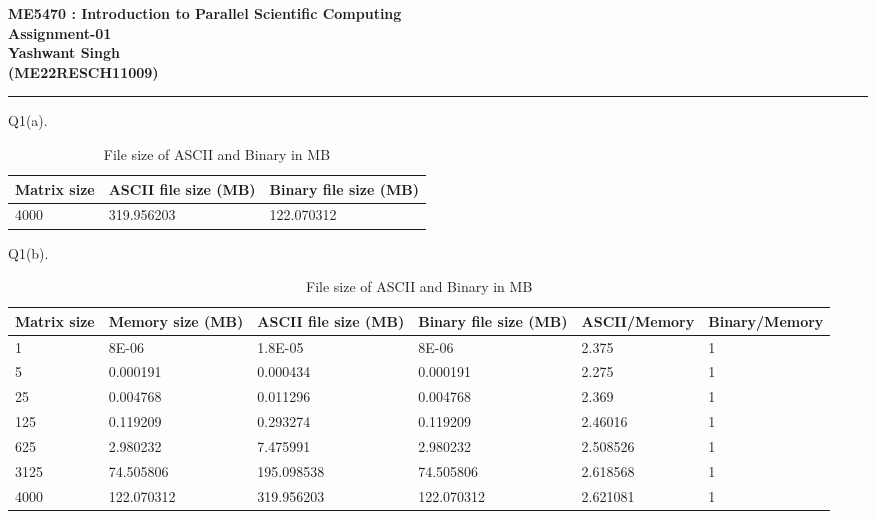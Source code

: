 \documentclass[12pt]{article}
\begin{document}
\begin{center}
\color{violet}

   \Large{\textbf{ME5470 : Introduction to Parallel Scientific Computing}}\\
   \Large{\textbf{Assignment-01}}\\
   \color{red}
   \vspace{5pt}
   \Large{\textbf{Yashwant Singh}}\\
   \Large{\textbf{(ME22RESCH11009)}}
    
\end{center}
\hrule
\vspace{15pt}
\par Q1(a).

\begin{table}[h]
  \centering
  \caption{File size of ASCII and Binary in MB}
  \vspace{10pt}
  \begin{tabular}{|m{2cm}|m{3.6cm}|m{3.7cm}|}
      \hline
     Matrix size & ASCII file size (MB) & Binary file size (MB) \\
      \hline
      4000 & 319.956203 & 122.070312 \\
      \hline
  \end{tabular}
  \label{tab:collapse_behavior11}
\end{table}

Q1(b).

\begin{table}[h]
  \centering
  \caption{File size of ASCII and Binary in MB}
  \vspace{10pt}
  \begin{tabular}{|m{2cm}|m{2cm}|m{2cm}|m{2cm}|m{2.8cm}|m{2.8cm}|}
      \hline
     Matrix size & Memory size (MB) & ASCII file size (MB) & Binary file size (MB) & ASCII/Memory & Binary/Memory\\
      \hline
      1 & 8E-06 & 1.8E-05 & 8E-06 & 2.375 & 1 \\
      \hline
      5 & 0.000191 & 0.000434 & 0.000191 & 2.275 & 1 \\
      \hline
      25 & 0.004768 & 0.011296 & 0.004768 & 2.369 & 1 \\
      \hline
      125 & 0.119209 & 0.293274 & 0.119209 & 2.46016 & 1 \\
      \hline
      625 & 2.980232 & 7.475991 & 2.980232 & 2.508526 & 1 \\
      \hline
      3125 & 74.505806 & 195.098538 & 74.505806 & 2.618568 & 1 \\
      \hline
      4000 & 122.070312 & 319.956203 & 122.070312 & 2.621081 & 1 \\
      \hline
  \end{tabular}
  \label{tab:collapse_behavior11}
\end{table}
\end{document}

